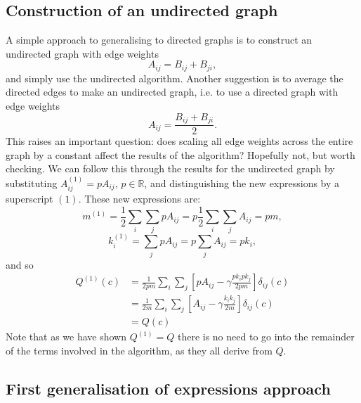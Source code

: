 \documentclass{article}
\begin{document}
\subsection{Construction of an undirected graph}
A simple approach to generalising to directed graphs is to construct 
an undirected graph with edge weights
\begin{equation}
A_{ij} = B_{ij} + B_{ji},
\label{eqn:undirectedAB}
\end{equation}
and simply use the undirected algorithm.
Another suggestion is to average the directed edges to make
an undirected graph, i.e. to use a directed graph with edge weights
\begin{equation}
A_{ij} = \frac{B_{ij} + B_{ji}}{2}.
\end{equation}
This raises an important question: does scaling all edge weights across 
the entire graph by a constant affect the results of the algorithm?
Hopefully not, but worth checking.
We can follow this through the results for the undirected graph by 
substituting $A_{ij}^{(1)} = pA_{ij}$, $p \in \mathbb{R}$, and 
distinguishing the new expressions by a superscript ${(1)}$. These
new expressions are:
\begin{equation}
m^{(1)} = \frac{1}{2}\sum_i\sum_jpA_{ij}  = p\frac{1}{2}\sum_i\sum_j A_{ij} = pm ,
\end{equation}
\begin{equation}
k_i^{(1)} = \sum_j{pA_{ij}} = p\sum_j{A_{ij}} = pk_i,
\end{equation}
and so
\begin{align*}
	Q^{(1)}(c) &= \frac{1}{2pm}\sum_i\sum_j\left[ pA_{ij} - \gamma \frac{pk_ipk_j}{2pm} \right] \delta_{ij}(c) \\
	&= \frac{1}{2m}\sum_i\sum_j\left[ A_{ij} - \gamma \frac{k_ik_j}{2m} \right] \delta_{ij}(c) \\
	&= Q(c)
\end{align*}
Note that as we have shown $Q^{(1)} = Q$ there is no need to go into the remainder of the terms 
involved in the algorithm, as they all derive from $Q$.

\subsection{First generalisation of expressions approach}
\end{document}
